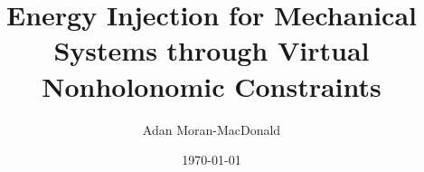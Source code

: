 \documentclass[12pt]{article}
\begin{document}
\title{Energy Injection for Mechanical Systems through Virtual Nonholonomic Constraints}
\author{Adan Moran-MacDonald}
\date{\today}
\maketitle

\cite{hybrid_zero_dynamics_bipedal_nhvcs}
\printbibliography
\end{document}
